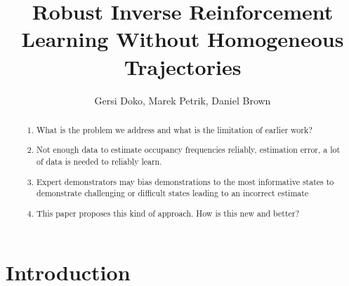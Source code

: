 \documentclass[11pt]{article}
\title{Robust Inverse Reinforcement Learning Without Homogeneous Trajectories}
\author{Gersi Doko, Marek Petrik, Daniel Brown}
\begin{document}
\maketitle

\begin{abstract}
	\begin{enumerate}
		\item What is the problem we address and what is the limitation of earlier work?
		\item Not enough data to estimate occupancy frequencies reliably, estimation error, a lot of data is needed to reliably learn.
		\item Expert demonstrators may bias demonstrations to the most informative states to demonstrate challenging or difficult states leading to an incorrect estimate
		\item This paper proposes this kind of approach. How is this new and better?
	\end{enumerate}
\end{abstract}


\section{Introduction}
\end{document}
